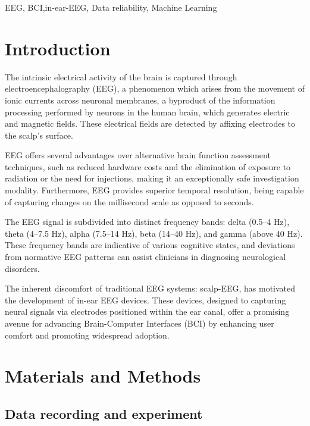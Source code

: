 \documentclass[conference]{IEEEtran}
\begin{document}
\begin{IEEEkeywords}
EEG, BCI,in-ear-EEG, Data reliability, Machine Learning 
\end{IEEEkeywords}

\vspace{2mm}
\section{Introduction}
\vspace{2mm}

The intrinsic electrical activity of the brain is captured through electroencephalography (EEG), a phenomenon which arises from the movement of ionic currents across neuronal membranes, a byproduct of the information processing performed by neurons in the human brain, which generates electric and magnetic fields. These electrical fields are detected by affixing electrodes to the scalp's surface. 

EEG offers several advantages over alternative brain function assessment techniques, such as reduced hardware costs and the elimination of exposure to radiation or the need for injections, making it an exceptionally safe investigation modality. Furthermore, EEG provides superior temporal resolution, being capable of capturing changes on the millisecond scale as opposed to seconds. 

The EEG signal is subdivided into distinct frequency bands: delta (0.5–4 Hz), theta (4–7.5 Hz), alpha (7.5–14 Hz), beta (14–40 Hz), and gamma (above 40 Hz). These frequency bands are indicative of various cognitive states, and deviations from normative EEG patterns can assist clinicians in diagnosing neurological disorders\cite{7813897}.

The inherent discomfort of traditional EEG systems: scalp-EEG, has motivated the development of in-ear EEG devices. These devices, designed to capturing neural signals via electrodes positioned within the ear canal, offer a promising avenue for advancing Brain-Computer Interfaces (BCI) by enhancing user comfort and promoting widespread adoption\cite{7858176}. 

\vspace{2mm}
\section{Materials and Methods}
\vspace{2mm}

\subsection{Data recording and experiment} 
\label{sec:DRaE}
\end{document}

